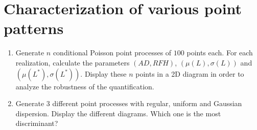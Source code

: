 \section{Characterization of various point patterns}
\begin{qbox}
\begin{enumerate}
	\item Generate $n$ conditional Poisson point processes of $100$ points each. For each realization, calculate the parameters $(AD,RFH)$, 
$(\mu(L),\sigma(L))$ and $(\mu(L^*),\sigma(L^*))$. Display these $n$ points in a 2D diagram in order to analyze the robustness of the 
quantification.
	\item Generate 3 different point processes with regular, uniform and Gaussian dispersion. Display the different diagrams. Which one 
is the most discriminant?
\end{enumerate}
\end{qbox}
